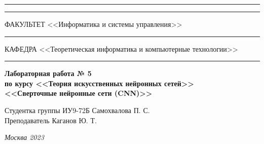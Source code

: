 \documentclass[a4paper, 14pt]{extarticle}
\begin{document}
\begin{titlepage}
\vspace{-25pt}
\hspace{-35pt}\rule{\textwidth}{2.3pt}

\vspace*{-20.3pt}
\hspace{-35pt}\rule{\textwidth}{0.4pt}

\vspace{1.5ex}
\hspace{-35pt} \noindent \small ФАКУЛЬТЕТ\hspace{80pt} <<Информатика и системы управления>>

\vspace*{-16pt}
\hspace{47pt}\rule{0.83\textwidth}{0.4pt}

\vspace{0.5ex}
\hspace{-35pt} \noindent \small КАФЕДРА\hspace{50pt} <<Теоретическая информатика и компьютерные технологии>>

\vspace*{-16pt}
\hspace{30pt}\rule{0.866\textwidth}{0.4pt}
  
\vspace{11em}

\begin{center}
\Large {\bf Лабораторная работа № 5} \\
\large {\bf по курсу <<Теория искусственных нейронных сетей>>} \\
\large {\bf <<Сверточные нейронные сети (CNN)>>} \\
\end{center}\normalsize

\vspace{8em}


\begin{flushright}
  {Студентка группы ИУ9-72Б Самохвалова П. С. \hspace*{15pt}\\
  \vspace{2ex}
  Преподаватель Каганов Ю. Т.\hspace*{15pt}}
\end{flushright}

\bigskip

\vfill
 

\begin{center}
\textsl{Москва 2023}
\end{center}
\end{titlepage}
\end{document}
